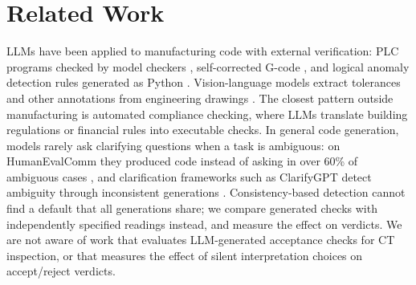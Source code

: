 \documentclass[letterpaper]{article} %
\begin{document}
\section{Related Work}
LLMs have been applied to manufacturing code with external verification: PLC programs checked by model checkers \cite{fakih2024llm4plc}, self-corrected G-code \cite{abdelaal2025gllm}, and logical anomaly detection rules generated as Python \cite{zhang2025logicode}. Vision-language models extract tolerances and other annotations from engineering drawings \cite{khan2024drawing}. The closest pattern outside manufacturing is automated compliance checking, where LLMs translate building regulations \cite{fuchs2024building,chen2025arceak} or financial rules \cite{li2025compliance} into executable checks. In general code generation, models rarely ask clarifying questions when a task is ambiguous: on HumanEvalComm they produced code instead of asking in over 60\% of ambiguous cases \cite{wu2024humanevalcomm}, and clarification frameworks such as ClarifyGPT detect ambiguity through inconsistent generations \cite{mu2024clarifygpt}. Consistency-based detection cannot find a default that all generations share; we compare generated checks with independently specified readings instead, and measure the effect on verdicts. We are not aware of work that evaluates LLM-generated acceptance checks for CT inspection, or that measures the effect of silent interpretation choices on accept/reject verdicts.
\end{document}
